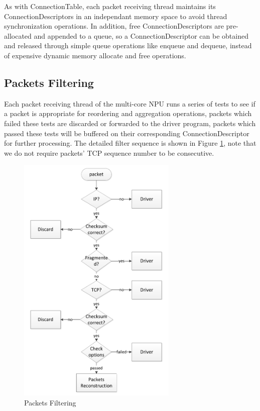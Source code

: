 \documentclass[conference]{IEEEtran}
\begin{document}
As with ConnectionTable, each packet receiving thread maintains its ConnectionDescriptors in an independant memory space to avoid thread synchronization operations. In addition, free ConnectionDescriptors are pre-allocated and appended to a queue, so a ConnectionDescriptor can be obtained and released through simple queue operations like enqueue and dequeue, instead of expensive dynamic memory allocate and free operations.
\subsection{Packets Filtering}
Each packet receiving thread of the multi-core NPU runs a series of tests to see if a packet is appropriate for reordering and aggregation operations, packets which failed these tests are discarded or forwarded to the driver program, packets which passed these tests will be buffered on their corresponding ConnectionDescriptor for further processing. The detailed filter sequence is shown in Figure \ref{packets filtering}, note that we do not require packets' TCP sequence number to be consecutive.
\begin{figure}[!t]
\centering
\includegraphics[width=3.0in]{filter_packets}
\caption{Packets Filtering}
\label{packets filtering}
\end{figure}
\end{document}
